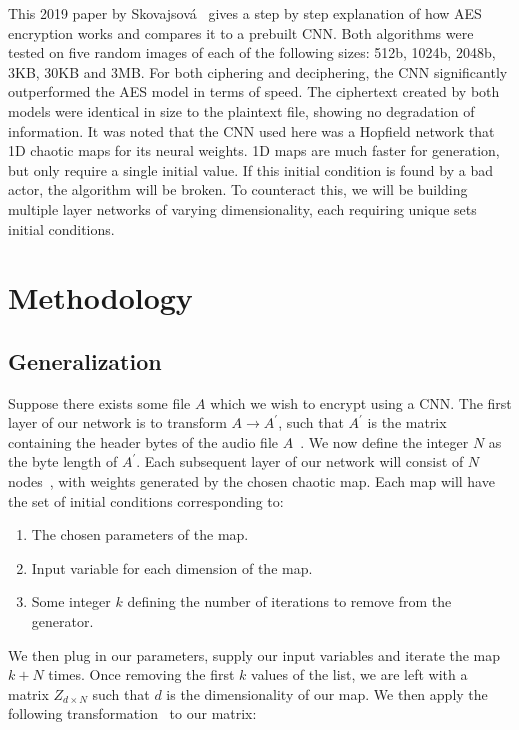 \documentclass[conference]{IEEEtran}
\begin{document}
This 2019 paper by Skovajsová~ gives a step by step explanation of how AES encryption works and compares it to a prebuilt CNN\@.
Both algorithms were tested on five random images of each of the following sizes: 512b, 1024b, 2048b, 3KB, 30KB and 3MB\@.
For both ciphering and deciphering, the CNN significantly outperformed the AES model in terms of speed.
The ciphertext created by both models were identical in size to the plaintext file, showing no degradation of information.
It was noted that the CNN used here was a Hopfield network that 1D chaotic maps for its neural weights.
1D maps are much faster for generation, but only require a single initial value.
If this initial condition is found by a bad actor, the algorithm will be broken.
To counteract this, we will be building multiple layer networks of varying dimensionality, each requiring unique sets initial conditions.

\section{Methodology}\label{sec:methodology}

\subsection{Generalization}\label{subsec:generalization}

Suppose there exists some file $A$ which we wish to encrypt using a CNN\@.
The first layer of our network is to transform $A \rightarrow A^\prime$, such that $A^\prime$ is the matrix containing the header bytes of the audio file $A$~\cite{app112110190}.
We now define the integer $N$ as the byte length of $A^\prime$.
Each subsequent layer of our network will consist of $N$ nodes~\cite{Ahmad2016}, with weights generated by the chosen chaotic map.
Each map will have the set of initial conditions corresponding to:

\begin{enumerate}
    \item The chosen parameters of the map.
    \item Input variable for each dimension of the map.
    \item Some integer $k$ defining the number of iterations to remove from the generator.
\end{enumerate}

We then plug in our parameters, supply our input variables and iterate the map $k+N$ times.
Once removing the first $k$ values of the list, we are left with a matrix $Z_{d\times N}$ such that $d$ is the dimensionality of our map.
We then apply the following transformation~\cite{Lokesh,app112110190} to our matrix:
\end{document}
